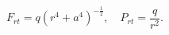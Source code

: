 \begin{equation}
F_{rt}= q (r^4+ a^4)^{- \frac{1}{2}},
\quad P_{rt}= \frac{q}{r^2}. 
\label{FrtBI}
\end{equation} 
